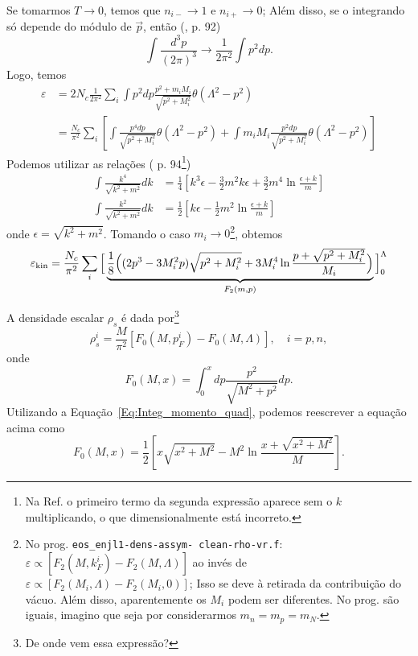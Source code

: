Se tomarmos $T \to 0$, temos que $n_{i-} \to 1$ e $n_{i+} \to 0$; Além disso, se o integrando só depende do módulo de $\vec{p}$, então (\cite{Glendenning}, p. 92)
\begin{equation}
	\int\frac{d^3p}{(2\pi)^3} \to \frac{1}{2\pi^2}\int p^2dp.
\end{equation}
%
Logo, temos
\begin{align}
	\varepsilon &= 2 N_c \frac{1}{2\pi^2}\sum_i \int p^2 dp \frac{p^2 + m_i M_i}{\sqrt{p^2 + M_i^2}} \theta(\Lambda^2 - p^2) \\
	&= \frac{N_c}{\pi^2}\sum_i\left[\int \frac{p^4dp}{\sqrt{p^2 + M_i^2}}\theta(\Lambda^2 - p^2) + \int m_i M_i \frac{p^2 dp}{\sqrt{p^2 + M_i^2}}\theta(\Lambda^2 - p^2)\right] \label{Eq:Engergia_cin_separada}
\end{align}
%
Podemos utilizar as relações (\cite{Glendenning} p. 94\footnote{Na Ref. o primeiro termo da segunda expressão aparece sem o $k$ multiplicando, o que dimensionalmente está incorreto.})
\begin{align}
	\int \frac{k^4}{\sqrt{k^2 + m^2}} dk &= \frac{1}{4}\left[k^3\epsilon - \frac{3}{2} m^2k\epsilon + \frac{3}{2}m^4\ln\frac{\epsilon + k}{m} \right]\\
	\int \frac{k^2}{\sqrt{k^2 + m^2}} dk &= \frac{1}{2}\left[k\epsilon - \frac{1}{2}m^2\ln\frac{\epsilon + k}{m}\right] \label{Eq:Integ_momento_quad}
\end{align}
%
onde $\epsilon = \sqrt{k^2+m^2}$. Tomando o caso $m_i \to 0$\footnote{No prog. \texttt{eos\_enjl1-dens-assym- clean-rho-vr.f}: $\varepsilon \propto [F_2(M, k_F^i) - F_2(M, \Lambda)]$ ao invés de $\varepsilon \propto [F_2(M_i, \Lambda) - F_2(M_i, 0)]$; Isso se deve à retirada da contribuição do vácuo. Além disso, aparentemente os $M_i$ podem ser diferentes. No prog. são iguais, imagino que seja por considerarmos $m_n = m_p = m_N$.}, obtemos
\begin{equation}\label{Eq:Energia_kin}
	\varepsilon_{\rm{kin}} = \frac{N_c}{\pi^2}\sum_i \Big[\underbrace{\frac{1}{8}\Big((2p^3 - 3M_i^2p)\sqrt{p^2 + M_i^2} + 3M_i^4\ln\frac{p + \sqrt{p^2 + M_i^2}}{M_i}\Big)}_{F_2(m,p)}\Big]_0^\Lambda
\end{equation}

A densidade escalar $\rho_s$ é dada por\footnote{De onde vem essa expressão?}
\begin{equation}\label{Eq:Dens_Escalar}
	\rho_s^i = \frac{M}{\pi^2}[F_0(M, p_F^i) - F_0(M, \Lambda)], \quad i = p, n,
\end{equation}
%
onde
\begin{equation}\label{Eq:Def_F0}
	F_0(M, x) = \int_0^x dp\frac{p^2}{\sqrt{M^2 + p^2}} dp.
\end{equation}
%
Utilizando a Equação~\eqref{Eq:Integ_momento_quad}, podemos reescrever a equação acima como
\begin{equation}
	F_0(M, x) = \frac{1}{2}\left[x\sqrt{x^2+M^2} - M^2 \ln \frac{x + \sqrt{x^2+M^2}}{M}\right].
\end{equation}

